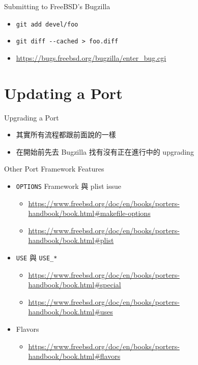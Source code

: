 \documentclass[aspectratio=169]{beamer}
\begin{document}
\begin{frame}[t,fragile]{Submitting to FreeBSD's Bugzilla}
  \begin{itemize}
    \item \verb`git add devel/foo`
    \item \verb`git diff --cached > foo.diff`
    \item \href{https://bugs.freebsd.org/bugzilla/enter_bug.cgi}{https://bugs.freebsd.org/bugzilla/enter\_bug.cgi}
  \end{itemize}
\end{frame}

\section{Updating a Port}
\begin{frame}[t,fragile]{Upgrading a Port}
  \begin{itemize}
    \item 其實所有流程都跟前面說的一樣
    \item 在開始前先去 Bugzilla 找有沒有正在進行中的 upgrading
  \end{itemize}
\end{frame}

\begin{frame}[t,fragile]{Other Port Framework Features}
  \begin{itemize}
    \item \verb`OPTIONS` Framework 與 plist issue
      \begin{itemize}
        \item \href{https://www.freebsd.org/doc/en/books/porters-handbook/book.html#makefile-options}{https://www.freebsd.org/doc/en/books/porters-handbook/book.html\#makefile-options}
        \item \href{https://www.freebsd.org/doc/en/books/porters-handbook/book.html#plist}{https://www.freebsd.org/doc/en/books/porters-handbook/book.html\#plist}
      \end{itemize}
    \item \verb`USE` 與 \verb`USE_*`
      \begin{itemize}
        \item \href{https://www.freebsd.org/doc/en/books/porters-handbook/book.html#special}{https://www.freebsd.org/doc/en/books/porters-handbook/book.html\#special}
        \item \href{https://www.freebsd.org/doc/en/books/porters-handbook/book.html#uses}{https://www.freebsd.org/doc/en/books/porters-handbook/book.html\#uses}
      \end{itemize}
    \item Flavors
      \begin{itemize}
        \item \href{https://www.freebsd.org/doc/en/books/porters-handbook/book.html#flavors}{https://www.freebsd.org/doc/en/books/porters-handbook/book.html\#flavors}
      \end{itemize}
  \end{itemize}
\end{frame}
\end{document}
